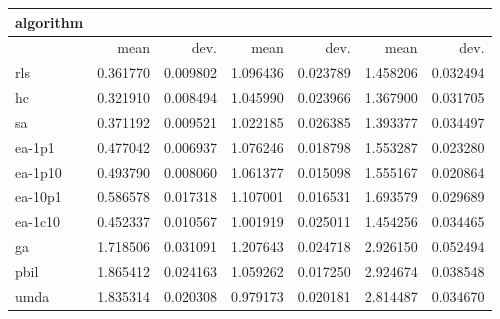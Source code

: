 \begin{tabular}{@{}l*{6}{>{{}}N{1}{2}}@{}}
\toprule
{algorithm} &  &  &  \\
\midrule
& {mean} & {dev.} & {mean} & {dev.} & {mean} & {dev.} \\
\midrule
rls & 0.361770 & 0.009802 & 1.096436 & 0.023789 & 1.458206 & 0.032494 \\
 hc & 0.321910 & 0.008494 & 1.045990 & 0.023966 & 1.367900 & 0.031705 \\
 sa & 0.371192 & 0.009521 & 1.022185 & 0.026385 & 1.393377 & 0.034497 \\
 ea-1p1 & 0.477042 & 0.006937 & 1.076246 & 0.018798 & 1.553287 & 0.023280 \\
 ea-1p10 & 0.493790 & 0.008060 & 1.061377 & 0.015098 & 1.555167 & 0.020864 \\
 ea-10p1 & 0.586578 & 0.017318 & 1.107001 & 0.016531 & 1.693579 & 0.029689 \\
 ea-1c10 & 0.452337 & 0.010567 & 1.001919 & 0.025011 & 1.454256 & 0.034465 \\
 ga & 1.718506 & 0.031091 & 1.207643 & 0.024718 & 2.926150 & 0.052494 \\
 pbil & 1.865412 & 0.024163 & 1.059262 & 0.017250 & 2.924674 & 0.038548 \\
 umda & 1.835314 & 0.020308 & 0.979173 & 0.020181 & 2.814487 & 0.034670 \\
 \bottomrule
\end{tabular}
